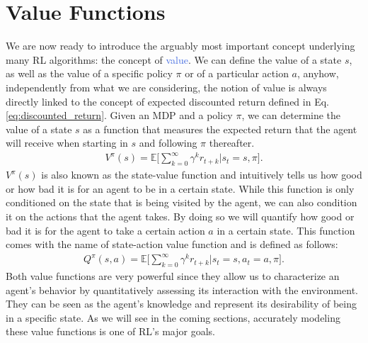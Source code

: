 \section{Value Functions}
\label{sec:value_functions}
We are now ready to introduce the arguably most important concept underlying many RL algorithms: the concept of \textcolor{RoyalBlue}{value}. We can define the value of a state $s$, as well as the value of a specific policy $\pi$ or of a particular action $a$, anyhow, independently from what we are considering, the notion of value is always directly linked to the concept of expected discounted return defined in Eq. \ref{eq:discounted_return}. Given an MDP and a policy $\pi$, we can determine the value of a state $s$ as a function that measures the expected return that the agent will receive when starting in $s$ and following $\pi$ thereafter. 
\begin{align}
    V^{\pi}(s)=\mathds{E}\bigg[\sum_{k=0}^{\infty}\gamma^{k}r_{t+k}\bigg| s_t = s, \pi \bigg].
    \label{eq:state_value_function}
\end{align}
$V^{\pi}(s)$ is also known as the state-value function and intuitively tells us how good or how bad it is for an agent to be in a certain state. While this function is only conditioned on the state that is being visited by the agent, we can also condition it on the actions that the agent takes. By doing so we will quantify how good or bad it is for the agent to take a certain action $a$ in a certain state. This function comes with the name of state-action value function and is defined as follows:
\begin{align}
     Q^{\pi}(s,a)=\mathds{E}\bigg[\sum_{k=0}^{\infty}\gamma^{k}r_{t+k} \bigg| s_t = s, a_t=a, \pi\bigg].
 \end{align}
Both value functions are very powerful since they allow us to characterize an agent's behavior by quantitatively assessing its interaction with the environment. They can be seen as the agent's knowledge and represent its desirability of being in a specific state. As we will see in the coming sections, accurately modeling these value functions is one of RL's major goals.  

